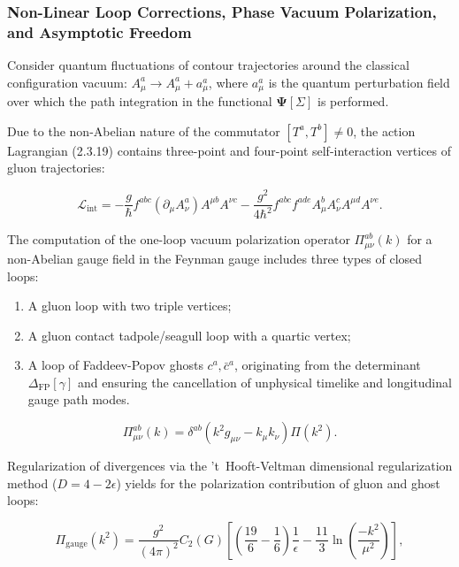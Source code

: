 \documentclass[11pt,a4paper]{article}
\theoremstyle{definition}
\begin{document}
\subsubsection{Non-Linear Loop Corrections, Phase Vacuum Polarization, and Asymptotic Freedom}\label{sec:2.3.4}

Consider quantum fluctuations of contour trajectories around the classical configuration vacuum: $A_\mu^a \to A_\mu^a + a_\mu^a$, where $a_\mu^a$ is the quantum perturbation field over which the path integration in the functional $\mathbf{\Psi}[\Sigma]$ is performed.

Due to the non-Abelian nature of the commutator $[T^a, T^b] \neq 0$, the action Lagrangian (2.3.19) contains three-point and four-point self-interaction vertices of gluon trajectories:

\begin{equation}\label{eq:2.3.21}\tag{2.3.21}
\mathcal{L}_{\text{int}} = - \frac{g}{\hbar} f^{abc} (\partial_\mu A_\nu^a) A^{\mu b} A^{\nu c} - \frac{g^2}{4\hbar^2} f^{abc} f^{ade} A_\mu^b A_\nu^c A^{\mu d} A^{\nu e}.
\end{equation}

The computation of the one-loop vacuum polarization operator $\Pi_{\mu\nu}^{ab}(k)$ for a non-Abelian gauge field in the Feynman gauge includes three types of closed loops:
\begin{enumerate}
\item A gluon loop with two triple vertices;
\item A gluon contact tadpole/seagull loop with a quartic vertex;
\item A loop of Faddeev-Popov ghosts $c^a, \bar{c}^a$, originating from the determinant $\Delta_{\text{FP}}[\gamma]$ and ensuring the cancellation of unphysical timelike and longitudinal gauge path modes.
\end{enumerate}

\begin{equation}\label{eq:2.3.22}\tag{2.3.22}
\Pi_{\mu\nu}^{ab}(k) = \delta^{ab} \left( k^2 g_{\mu\nu} - k_\mu k_\nu \right) \Pi(k^2).
\end{equation}

Regularization of divergences via the 't~Hooft-Veltman dimensional regularization method ($D = 4 - 2\epsilon$) yields for the polarization contribution of gluon and ghost loops:

\begin{equation}\label{eq:2.3.23}\tag{2.3.23}
\Pi_{\text{gauge}}(k^2) = \frac{g^2}{(4\pi)^2} C_2(G) \left[ \left( \frac{19}{6} - \frac{1}{6} \right) \frac{1}{\epsilon} - \frac{11}{3} \ln\left( \frac{-k^2}{\mu^2} \right) \right],
\end{equation}
\end{document}
